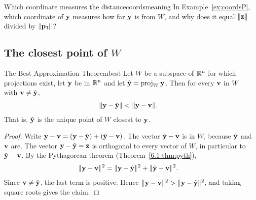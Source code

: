 \documentclass[11pt]{article}
\begin{document}
\begin{think}{Which coordinate measures the distance}{coordsmeaning}
In Example~\ref{ex:coordsP}, which coordinate of $\mathbf{y}$ measures how far $\mathbf{y}$ is from $W$, and why does it equal $\lVert\mathbf{z}\rVert$ divided by $\lVert\mathbf{p}_3\rVert$?
\end{think}

\subsection*{The closest point of $W$}

\begin{thm}{The Best Approximation Theorem}{best}
Let $W$ be a subspace of $\mathbb{R}^n$ for which projections exist, let $\mathbf{y}$ be in $\mathbb{R}^n$ and let $\hat{\mathbf{y}}=\operatorname{proj}_W\mathbf{y}$. Then for every $\mathbf{v}$ in $W$ with $\mathbf{v}\neq\hat{\mathbf{y}}$,
\[
\lVert\mathbf{y}-\hat{\mathbf{y}}\rVert<\lVert\mathbf{y}-\mathbf{v}\rVert .
\]
That is, $\hat{\mathbf{y}}$ is the unique point of $W$ closest to $\mathbf{y}$.
\end{thm}

\begin{proof}
Write $\mathbf{y}-\mathbf{v}=(\mathbf{y}-\hat{\mathbf{y}})+(\hat{\mathbf{y}}-\mathbf{v})$. The vector $\hat{\mathbf{y}}-\mathbf{v}$ is in $W$, because $\hat{\mathbf{y}}$ and $\mathbf{v}$ are. The vector $\mathbf{y}-\hat{\mathbf{y}}=\mathbf{z}$ is orthogonal to every vector of $W$, in particular to $\hat{\mathbf{y}}-\mathbf{v}$. By the Pythagorean theorem (Theorem~\ref{6.1-thm:pyth}),
\[
\lVert\mathbf{y}-\mathbf{v}\rVert^2=\lVert\mathbf{y}-\hat{\mathbf{y}}\rVert^2+\lVert\hat{\mathbf{y}}-\mathbf{v}\rVert^2 .
\]
Since $\mathbf{v}\neq\hat{\mathbf{y}}$, the last term is positive. Hence $\lVert\mathbf{y}-\mathbf{v}\rVert^2>\lVert\mathbf{y}-\hat{\mathbf{y}}\rVert^2$, and taking square roots gives the claim.
\end{proof}

\begin{center}
\end{center}
\end{document}

